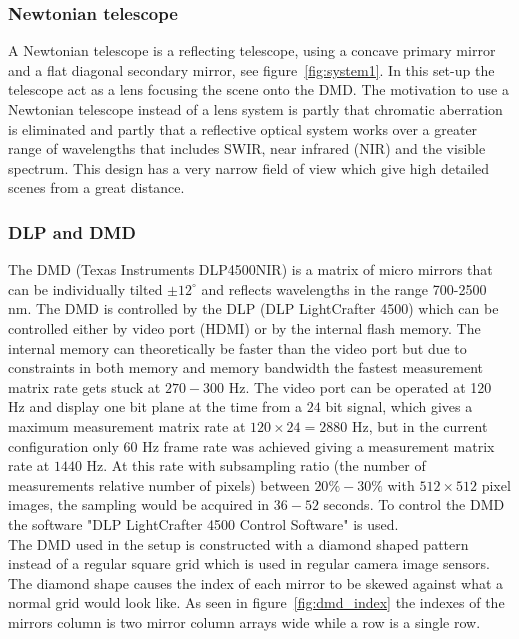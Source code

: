 \subsubsection{Newtonian telescope}
A Newtonian telescope is a reflecting telescope, using a concave primary mirror and a flat diagonal secondary mirror, see figure~\ref{fig:system1}. In this set-up the telescope act as a lens focusing the scene onto the DMD. The motivation to use a Newtonian telescope instead of a lens system is partly that chromatic aberration is eliminated and partly that a reflective optical system works over a greater range of wavelengths that includes SWIR, near infrared (NIR) and the visible spectrum. This design has a very narrow field of view which give high detailed scenes from a great distance. 


\subsubsection{DLP and DMD}
The DMD (Texas Instruments DLP4500NIR) is a matrix of micro mirrors that can be individually tilted $\pm 12^{\circ}$ and reflects wavelengths in the range 700-2500 nm. The DMD is controlled by the DLP (DLP LightCrafter 4500) which can be controlled either by video port (HDMI) or by the internal flash memory. The internal memory can theoretically be faster than the video port but due to constraints in both memory and memory bandwidth the fastest measurement matrix rate gets stuck at $270 - 300$ Hz. The video port can be operated at 120 Hz and display one bit plane at the time from a $24$ bit signal, which gives a maximum measurement matrix rate at $120 \times 24 = 2880$ Hz, but in the current configuration only $60$ Hz frame rate was achieved giving a measurement matrix rate at $1440$ Hz. At this rate with subsampling ratio (the number of measurements relative number of pixels) between $20\% - 30\%$ with $512\times512$ pixel images, the sampling would be acquired in $36 - 52$ seconds. To control the DMD the software "DLP LightCrafter 4500 Control Software" is used.\\[0.1in] 

The DMD used in the setup is constructed with a diamond shaped pattern instead of a regular square grid which is used in regular camera image sensors. The diamond shape causes the index of each mirror to be skewed against what a normal grid would look like. As seen in figure~\ref{fig:dmd_index} the indexes of the mirrors column is two mirror column arrays wide while a row is a single row. 


